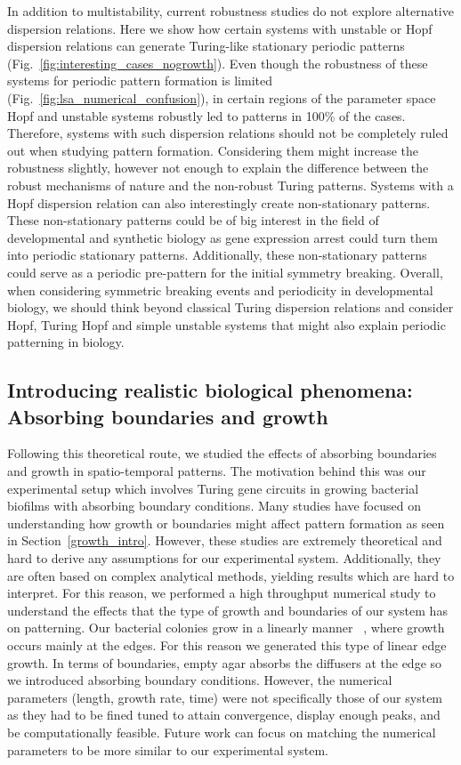 In addition to multistability, current robustness studies do not explore alternative dispersion relations.
Here we show how certain systems with unstable or Hopf dispersion relations can generate Turing-like stationary periodic patterns (Fig.~\ref{fig:interesting_cases_nogrowth}).
Even though the robustness of these systems for periodic pattern formation is limited (Fig.~\ref{fig:lsa_numerical_confusion}), in certain regions of the parameter space Hopf and unstable systems robustly led to patterns in 100\% of the cases.
Therefore, systems with such dispersion relations should not be completely ruled out when studying pattern formation.
Considering them might increase the robustness slightly, however not enough to explain the difference between the robust mechanisms of nature and the non-robust Turing patterns.
Systems with a Hopf dispersion relation can also interestingly create non-stationary patterns.
These non-stationary patterns could be of big interest in the field of developmental and synthetic biology as gene expression arrest could turn them into periodic stationary patterns.
Additionally, these non-stationary patterns could serve as a periodic pre-pattern for the initial symmetry breaking.
Overall, when considering symmetric breaking events and periodicity in developmental biology, we should think beyond classical Turing dispersion relations and consider Hopf, Turing Hopf and simple unstable systems that might also explain periodic patterning in biology.

\subsection*{Introducing realistic biological phenomena: Absorbing boundaries and growth}
Following this theoretical route, we studied the effects of absorbing boundaries and growth in spatio-temporal patterns.
The motivation behind this was our experimental setup which involves Turing gene circuits in growing bacterial biofilms with absorbing boundary conditions.
Many studies have focused on understanding how growth or boundaries might affect pattern formation as seen in Section~\ref{growth_intro}.
However, these studies are extremely theoretical and hard to derive any assumptions for our experimental system.
Additionally, they are often based on complex analytical methods, yielding results which are hard to interpret.
For this reason, we performed a high throughput numerical study to understand the effects that the type of growth and boundaries of our system has on patterning.
Our bacterial colonies grow in a linearly manner ~\cite{Tica2023}, where growth occurs mainly at the edges.
For this reason we generated this type of linear edge growth.
In terms of boundaries, empty agar absorbs the diffusers at the edge so we introduced absorbing boundary conditions.
However, the numerical parameters (length, growth rate, time) were not specifically those of our system as they had to be fined tuned to attain convergence, display enough peaks, and be computationally feasible.
Future work can focus on matching the numerical parameters to be more similar to our experimental system.

